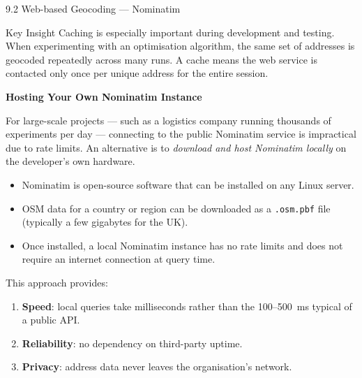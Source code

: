 \documentclass[aspectratio=169,10pt]{beamer}
\begin{document}
\begin{frame}[allowframebreaks]{9.2 Web-based Geocoding --- Nominatim}
  \begin{alertblock}{Key Insight}
    Caching is especially important during development and testing.  When
    experimenting with an optimisation algorithm, the same set of addresses
    is geocoded repeatedly across many runs.  A cache means the web service
    is contacted only once per unique address for the entire session.
  \end{alertblock}

  \framebreak

  \textbf{Hosting Your Own Nominatim Instance}

  \medskip
  For large-scale projects --- such as a logistics company running
  thousands of experiments per day --- connecting to the public Nominatim
  service is impractical due to rate limits.  An alternative is to
  \emph{download and host Nominatim locally} on the developer's own hardware.

  \begin{itemize}
    \item Nominatim is open-source software that can be installed on any
          Linux server.
    \item OSM data for a country or region can be downloaded as a
          \texttt{.osm.pbf} file (typically a few gigabytes for the UK).
    \item Once installed, a local Nominatim instance has no rate limits
          and does not require an internet connection at query time.
  \end{itemize}

  This approach provides:
  \begin{enumerate}
    \item \textbf{Speed}: local queries take milliseconds rather than the
          100--500~ms typical of a public API.
    \item \textbf{Reliability}: no dependency on third-party uptime.
    \item \textbf{Privacy}: address data never leaves the organisation's
          network.
  \end{enumerate}

\end{frame}
\end{document}
